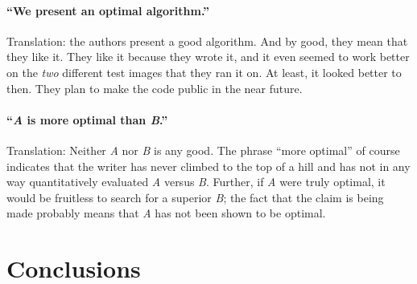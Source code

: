 \documentclass[12pt, preprint]{aastex}
\begin{document}
\paragraph{``We present an optimal algorithm.''}
Translation: the authors present a good algorithm.  And by good, they
mean that they like it.  They like it because they wrote it, and it
even seemed to work better on the \emph{two} different test images
that they ran it on.  At least, it looked better to then.  They plan
to make the code public in the near future.



\paragraph{``\emph{A} is more optimal than \emph{B}.''}
Translation: Neither \emph{A} nor \emph{B} is any good.  The phrase
``more optimal'' of course indicates that the writer has never climbed
to the top of a hill and has not in any way quantitatively evaluated
\emph{A} versus \emph{B}.  Further, if \emph{A} were truly optimal, it
would be fruitless to search for a superior \emph{B}; the fact that
the claim is being made probably means that \emph{A} has not been
shown to be optimal.




\section{Conclusions}
\end{document}
